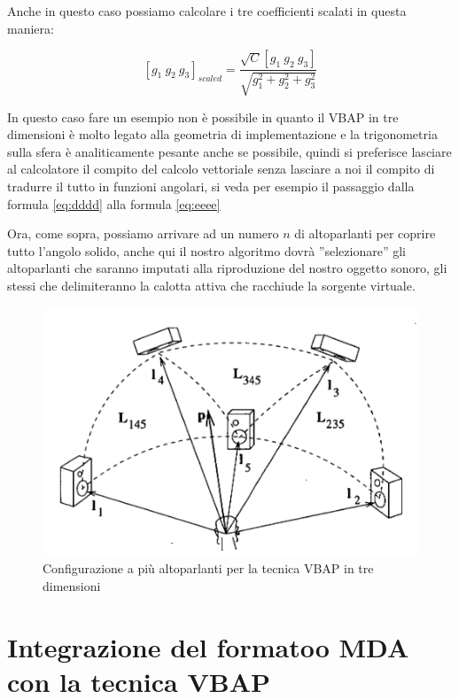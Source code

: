 \documentclass[12pt,a4paper]{report}
\begin{document}
Anche in questo caso possiamo calcolare i tre coefficienti scalati in questa maniera:

\begin{equation}
\left[g_1 \ g_2 \ g_3 \right]_{scaled} = \dfrac{\sqrt{C} \left[ g_1 \ g_2 \ g_3 \right]}{\sqrt{g_1^2 + g_2^2 + g_3^2}}
\label{iiii}
\end{equation}

In questo caso fare un esempio non è possibile in quanto il VBAP in tre dimensioni è molto legato alla geometria di implementazione e la trigonometria sulla sfera è analiticamente pesante anche se possibile, quindi si preferisce lasciare al calcolatore il compito del calcolo vettoriale senza lasciare a noi il compito di tradurre il tutto in funzioni angolari, si veda per esempio il passaggio dalla formula \ref{eq:dddd} alla formula \ref{eq:eeee}

Ora, come sopra, possiamo arrivare ad un numero $n$ di altoparlanti per coprire tutto l'angolo solido, anche qui il nostro algoritmo dovrà ''selezionare'' gli altoparlanti che saranno imputati alla riproduzione del nostro oggetto sonoro, gli stessi che delimiteranno la calotta attiva che racchiude la sorgente virtuale.

\begin{figure}[htbp]
	\centering
	\includegraphics[scale=0.50 ]{figures/matrix3dfull.png}
	\caption {Configurazione a più altoparlanti per la tecnica VBAP in tre dimensioni}
	\label{fig:matrix3dfull}
	\end{figure}


\section{Integrazione del formatoo MDA con la tecnica VBAP}
\end{document}
